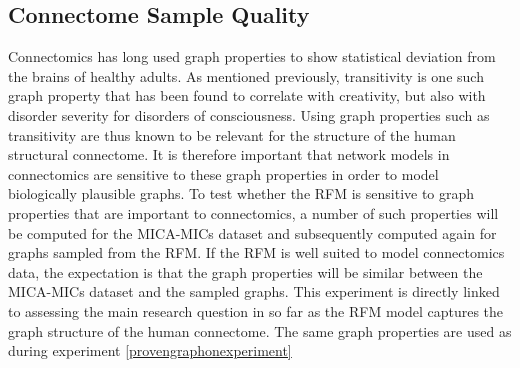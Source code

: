 \documentclass[11pt]{report} %
\begin{document}
\subsection{Connectome Sample Quality}
\label{samplequalityexperiment}
Connectomics has long used graph properties to show statistical deviation from the brains of healthy adults. As mentioned previously, transitivity is one such graph property that has been found to correlate with creativity, but also with disorder severity for disorders of consciousness. Using graph properties such as transitivity are thus known to be relevant for the structure of the human structural connectome. 
It is therefore important that network models in connectomics are sensitive to these graph properties in order to model biologically plausible graphs. 
To test whether the RFM is sensitive to graph properties that are important to connectomics, a number of such properties will be computed for the MICA-MICs dataset and subsequently computed again for graphs sampled from the RFM.
If the RFM is well suited to model connectomics data, the expectation is that the graph properties will be similar between the MICA-MICs dataset and the sampled graphs.
This experiment is directly linked to assessing the main research question in so far as the RFM model captures the graph structure of the human connectome. The same graph properties are used as during experiment \ref{provengraphonexperiment}
\end{document}
